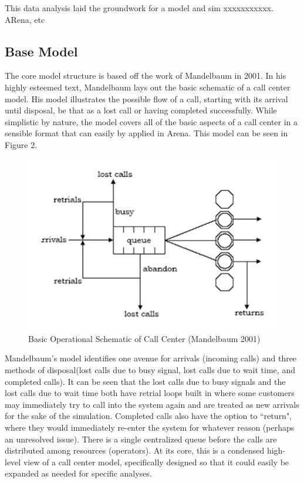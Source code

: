 \documentclass[12pt]{article}
\begin{document}
This data analysis laid the groundwork for a model and sim xxxxxxxxxxx.  ARena, etc


	\subsection{Base Model}
The core model structure is based off the work of Mandelbaum in 2001\cite{mandelbaum}.  In his highly esteemed text, Mandelbaum lays out the basic schematic of a call center model.  His model illustrates the possible flow of a call, starting with its arrival until disposal, be that as a lost call or having completed successfully.  While simplistic by nature, the model covers all of the basic aspects of a call center in a sensible format that can easily by applied in Arena.  This model can be seen in Figure 2.  

	\begin{figure}[h]
	\includegraphics[scale=.45]{call_center_layout.png}
	\caption{Basic Operational Schematic of Call Center (Mandelbaum 2001)}
	\end{figure}

Mandelbaum's model identifies one avenue for arrivals (incoming calls) and three methods of disposal(lost calls due to busy signal, lost calls due to wait time, and completed calls).  It can be seen that the lost calls due to busy signals and the lost calls due to wait time both have retrial loops built in where some customers may immediately try to call into the system again and are treated as new arrivals for the sake of the simulation.  Completed calls also have the option to ``return", where they would immediately re-enter the system for whatever reason (perhaps an unresolved issue).  There is a single centralized queue before the calls are distributed among resources (operators).  At its core, this is a condensed high-level view of a call center model, specifically designed so that it could easily be expanded as needed for specific analyses.
\end{document}
